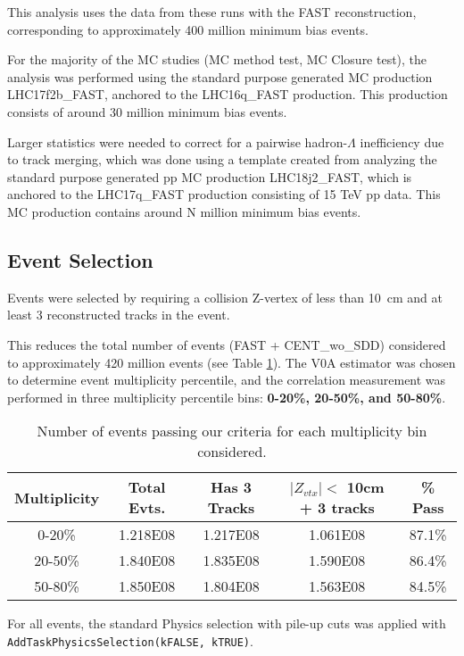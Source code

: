 \documentclass[ALICE,manyauthors]{ALICE_analysis_notes}
\begin{document}
This analysis uses the data from these runs with the FAST reconstruction, corresponding to approximately 400 million minimum bias events.

For the majority of the MC studies (MC method test, MC Closure test), the analysis was performed using the standard purpose generated MC production LHC17f2b\_FAST, anchored to the LHC16q\_FAST production. This production consists of around 30 million minimum bias events.

Larger statistics were needed to correct for a pairwise hadron-$\Lambda$ inefficiency due to track merging, which was done using a template created from analyzing the standard purpose generated pp MC production LHC18j2\_FAST, which is anchored to the LHC17q\_FAST production consisting of 15 TeV pp data. 
This MC production contains around N million minimum bias events.

\subsection{Event Selection}

Events were selected by requiring a collision Z-vertex of less than \SI{10}{cm} and at least 3 reconstructed tracks in the event.  

This reduces the total number of events (FAST + CENT\_wo\_SDD) considered to approximately 420 million events (see Table \ref{evttab}). The V0A estimator was chosen to determine event multiplicity percentile, and the correlation measurement was performed in three multiplicity percentile bins: \textbf{0-20\%, 20-50\%, and 50-80\%}.

\begin{table}[h!]
    \centering
\begin{tabular}{| c | c | c | c || c | }
\hline
Multiplicity & Total Evts. & Has 3 Tracks & $|Z_{vtx}| <$  10cm + 3 tracks & \% Pass \\
\hline
0-20\% & 1.218E08 & 1.217E08 & 1.061E08 & 87.1\%\\
20-50\% & 1.840E08 & 1.835E08 & 1.590E08 & 86.4\%\\
50-80\% & 1.850E08 & 1.804E08 & 1.563E08 & 84.5\%\\
\hline
\end{tabular}
\caption{Number of events passing our criteria for each multiplicity bin considered.}
\label{evttab}
\end{table}

For all events, the standard Physics selection with pile-up cuts was applied with \texttt{AddTaskPhysicsSelection(kFALSE, kTRUE)}.
\end{document}
